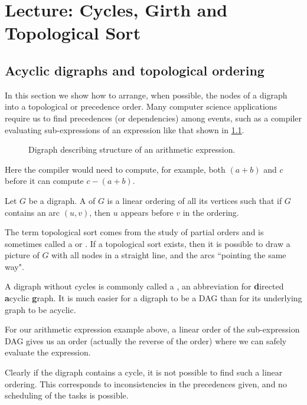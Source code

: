 \chapter{Lecture: Cycles, Girth and Topological Sort}


\section{Acyclic digraphs and topological ordering}
\label{sec:dag}

In this section we show how to arrange, when possible, the nodes
of a digraph into a topological or precedence order.  Many computer
science applications require us to find precedences (or dependencies)
among events, such as a compiler evaluating sub-expressions of an
expression like that shown in \cref{fig:prec}.

\begin{figure}[hbtp]
\centerline{}

\caption{Digraph describing structure of an arithmetic expression.}
\label{fig:prec}
\end{figure}

Here the compiler would need to compute, for example, both $(a+b)$ and
$c$ before it can compute $c-(a+b)$.

\begin{Definition}
Let $G$ be a digraph. A  of $G$ is a linear
ordering of all its vertices such that if $G$ contains an arc $(u,v)$,
then $u$ appears before $v$ in the ordering.
\end{Definition}

The term topological sort comes from the study of partial orders and is
sometimes called a  or .
 If a topological sort exists, then it is possible to draw a picture  of
$G$ with all nodes in a straight line, and the arcs ``pointing the same
way".

A digraph without cycles is commonly called a , an
abbreviation for \textbf{d}irected \textbf{a}cyclic
\textbf{g}raph. It is much easier for a digraph to be a
DAG than for its underlying graph to be acyclic. %

For our arithmetic expression example above, a linear
order of the sub-expression DAG gives us an order (actually the reverse
of the order) where we can safely evaluate the expression.

Clearly if the digraph contains a cycle, it is not possible to find
such a linear ordering. This corresponds to inconsistencies in the
precedences given, and no scheduling of the tasks is possible.

